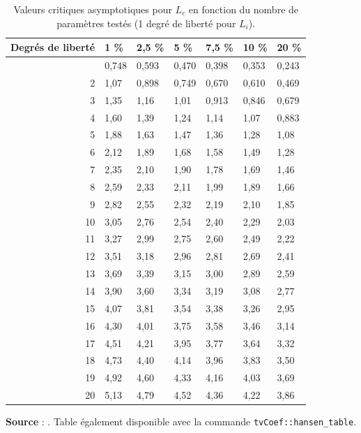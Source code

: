 \documentclass[
  a4paper,
  DIV=11,
  numbers=noendperiod,
  french]{scrartcl}
\newcommand\1{{\mathds 1}}
\theoremstyle{remark}
\begin{document}
\begin{longtable}[]{@{}rllllll@{}}

\caption{\label{tbl-hansen-table}Valeurs critiques asymptotiques pour
\(L_c\) en fonction du nombre de paramètres testés (1 degré de liberté
pour \(L_i\)).}

\tabularnewline

\toprule\noalign{}
Degrés de liberté & 1 \% & 2,5 \% & 5 \% & 7,5 \% & 10 \% & 20 \% \\
\midrule\noalign{}
\endhead
\bottomrule\noalign{}
\endlastfoot
1 & 0,748 & 0,593 & 0,470 & 0,398 & 0,353 & 0,243 \\
2 & 1,07 & 0,898 & 0,749 & 0,670 & 0,610 & 0,469 \\
3 & 1,35 & 1,16 & 1,01 & 0,913 & 0,846 & 0,679 \\
4 & 1,60 & 1,39 & 1,24 & 1,14 & 1,07 & 0,883 \\
5 & 1,88 & 1,63 & 1,47 & 1,36 & 1,28 & 1,08 \\
6 & 2,12 & 1,89 & 1,68 & 1,58 & 1,49 & 1,28 \\
7 & 2,35 & 2,10 & 1,90 & 1,78 & 1,69 & 1,46 \\
8 & 2,59 & 2,33 & 2,11 & 1,99 & 1,89 & 1,66 \\
9 & 2,82 & 2,55 & 2,32 & 2,19 & 2,10 & 1,85 \\
10 & 3,05 & 2,76 & 2,54 & 2,40 & 2,29 & 2,03 \\
11 & 3,27 & 2,99 & 2,75 & 2,60 & 2,49 & 2,22 \\
12 & 3,51 & 3,18 & 2,96 & 2,81 & 2,69 & 2,41 \\
13 & 3,69 & 3,39 & 3,15 & 3,00 & 2,89 & 2,59 \\
14 & 3,90 & 3,60 & 3,34 & 3,19 & 3,08 & 2,77 \\
15 & 4,07 & 3,81 & 3,54 & 3,38 & 3,26 & 2,95 \\
16 & 4,30 & 4,01 & 3,75 & 3,58 & 3,46 & 3,14 \\
17 & 4,51 & 4,21 & 3,95 & 3,77 & 3,64 & 3,32 \\
18 & 4,73 & 4,40 & 4,14 & 3,96 & 3,83 & 3,50 \\
19 & 4,92 & 4,60 & 4,33 & 4,16 & 4,03 & 3,69 \\
20 & 5,13 & 4,79 & 4,52 & 4,36 & 4,22 & 3,86 \\

\end{longtable}

{\footnotesize\raggedright 

\textbf{Source} : \textcite{hansen1990lagrange}. Table également
disponible avec la commande \texttt{tvCoef::hansen\_table}.

}
\end{document}
